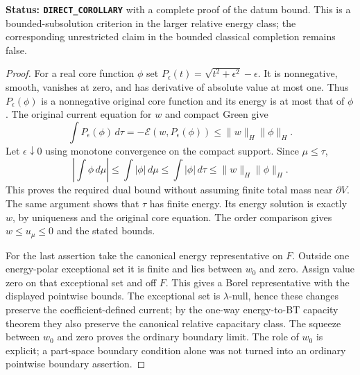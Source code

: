 \documentclass[11pt,a4paper]{article}
\numberwithin{equation}{section}
\theoremstyle{definition}
\theoremstyle{remark}
\begin{document}
\noindent\textbf{Status: \texttt{DIRECT\_COROLLARY}} with a complete
proof of the datum bound. This is a bounded-subsolution criterion in
the larger relative energy class; the corresponding unrestricted claim
in the bounded classical completion remains false.

\begin{proof}
For a real core function $\phi$ set
$P_\epsilon(t)=\sqrt{t^2+\epsilon^2}-\epsilon$.
It is nonnegative, smooth, vanishes at zero, and has derivative of
absolute value at most one. Thus $P_\epsilon(\phi)$ is a nonnegative
original core function and its energy is at most that of $\phi$.
The original current equation for $w$ and compact Green give
\[
 \int P_\epsilon(\phi)\,d\tau
       =-\mathcal E(w,P_\epsilon(\phi))
                         \le\|w\|_H\|\phi\|_H.
\]
Let $\epsilon\downarrow0$ using monotone convergence on the compact
support. Since $\mu\le\tau$,
\[
       \left|\int\phi\,d\mu\right|
          \le\int|\phi|\,d\mu
          \le\int|\phi|\,d\tau
                         \le\|w\|_H\|\phi\|_H.
\]
This proves the required dual bound without assuming finite total mass
near $\partial V$. The same argument shows that $\tau$ has finite
energy. Its energy solution is exactly $w$, by uniqueness and the
original core equation. The order comparison gives $w\le u_\mu\le0$
and the stated bounds.

For the last assertion take the canonical energy representative on
$F$. Outside one energy-polar exceptional set it is finite and lies
between $w_0$ and zero. Assign value zero on that exceptional set and
off $F$. This gives a Borel representative with the displayed pointwise
bounds. The exceptional set is $\lambda$-null, hence these changes
preserve the coefficient-defined current; by the one-way energy-to-BT
capacity theorem they also preserve the canonical relative capacitary
class. The squeeze between $w_0$ and zero proves the ordinary boundary
limit. The role of $w_0$ is explicit; a part-space boundary condition
alone was not turned into an ordinary pointwise boundary assertion.
\end{proof}
\end{document}
